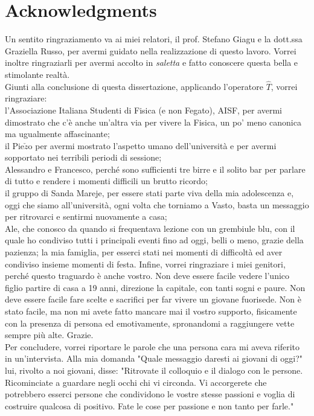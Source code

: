 \chapter{Acknowledgments}
Un sentito ringraziamento va ai miei relatori, il prof. Stefano Giagu e la dott.ssa Graziella Russo, per avermi guidato nella realizzazione di questo lavoro. Vorrei inoltre ringraziarli per avermi accolto in \textit{saletta} e fatto conoscere questa bella e stimolante realtà.\\
Giunti alla conclusione di questa dissertazione, applicando l'operatore $\hat{T}$, vorrei ringraziare:\\
l'Associazione Italiana Studenti di Fisica (e non Fegato), AISF, per avermi dimostrato che c'è anche un'altra via per vivere la Fisica, un po' meno canonica ma ugualmente affascinante;\\
il Pie$\check{z}$o per avermi mostrato l'aspetto umano dell'università e per avermi sopportato nei terribili periodi di sessione; \\
Alessandro e Francesco, perché sono sufficienti tre birre e il solito bar per parlare di tutto e rendere i momenti difficili un brutto ricordo;\\ 
il gruppo di Sanda Mareje, per essere stati parte viva della mia adolescenza e, oggi che siamo all'università, ogni volta che torniamo a Vasto, basta un messaggio per ritrovarci e sentirmi nuovamente a casa;\\
Ale, che conosco da quando si frequentava lezione con un grembiule blu, con il quale ho condiviso tutti i principali eventi fino ad oggi, belli o meno, grazie della pazienza;
la mia famiglia, per esserci stati nei momenti di difficoltà ed aver condiviso insieme momenti di festa.
Infine, vorrei ringraziare i miei genitori, perché questo traguardo è anche vostro. Non deve essere facile vedere l'unico figlio partire di casa a 19 anni, direzione la capitale, con tanti sogni e paure. Non deve essere facile fare scelte e sacrifici per far vivere un giovane fuorisede. Non è stato facile, ma non mi avete fatto mancare mai il vostro supporto, fisicamente con la presenza di persona ed emotivamente, spronandomi a raggiungere vette sempre più alte. Grazie.\\
Per concludere, vorrei riportare le parole che una persona cara mi aveva riferito in un'intervista. Alla mia domanda "Quale messaggio daresti ai giovani di oggi?" lui, rivolto a noi giovani, disse: "Ritrovate il colloquio e il dialogo con le persone. Ricominciate a guardare negli occhi chi vi circonda. Vi accorgerete che potrebbero esserci persone che condividono le vostre stesse passioni e voglia di costruire qualcosa di positivo. Fate le cose per passione e non tanto per farle."
